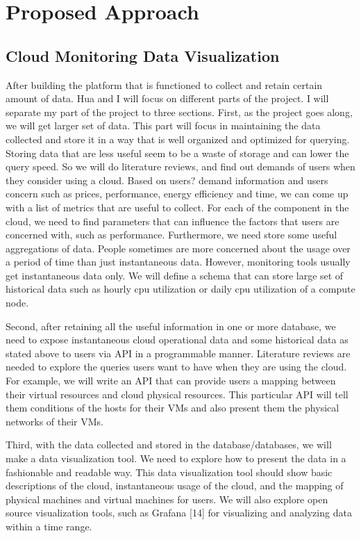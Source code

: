 \section{Proposed Approach}
\label{sec:ProposedApproach}



\subsection{Cloud Monitoring Data Visualization}
  
  After building the platform that is functioned to collect and retain certain amount of data. Hua and I will focus on different parts of the project. I will separate my part of the project to three sections. First, as the project goes along, we will get larger set of data. This part will focus in maintaining the data collected and store it in a way that is well organized and optimized for querying. Storing data that are less useful seem to be a waste of storage and can lower the query speed. So we will do literature reviews, and find out demands of users when they consider using a cloud. Based on users? demand information and users concern such as prices, performance, energy efficiency and time, we can come up with a list of metrics that are useful to collect. For each of the component in the cloud, we need to find parameters that can influence the factors that users are concerned with, such as performance. Furthermore, we need store some useful aggregations of data. People sometimes are more concerned about the usage over a period of time than just instantaneous data. However, monitoring tools usually get instantaneous data only. We will define a schema that can store large set of historical data such as hourly cpu utilization or daily cpu utilization of a compute node.
  
  Second, after retaining all the useful information in one or more database, we need to expose instantaneous cloud operational data  and some historical data as stated above to users via API in a programmable manner. Literature reviews are needed to explore the queries users want to have when they are using the cloud. For example, we will write an API that can provide users a mapping between their virtual resources and cloud physical resources. This particular API will tell them conditions of  the hosts for their VMs and also present them the physical networks of their VMs. 
  
  Third, with the data collected and stored in the database/databases, we will make a data visualization tool. We need to explore how to present the data in a fashionable and readable way. This data visualization tool should show basic descriptions of the cloud, instantaneous usage of the cloud, and the mapping of physical machines and virtual machines for users. We will also explore open source visualization tools, such as Grafana [14] for visualizing and analyzing data within a time range.



